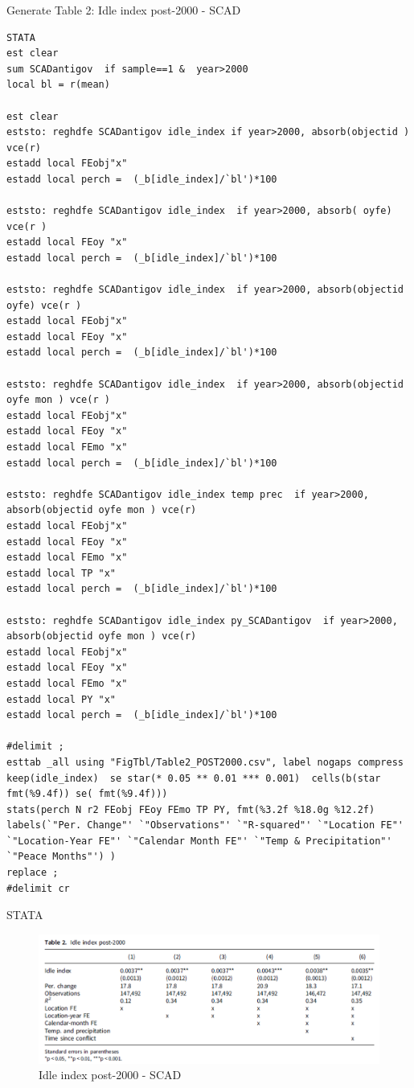 \documentclass[12pt,letterpaper]{article}
\begin{document}
\newpage

Generate Table 2: Idle index post-2000 - SCAD

\begin{lstlisting}
STATA
est clear 
sum SCADantigov  if sample==1 &  year>2000
local bl = r(mean) 

est clear
eststo: reghdfe SCADantigov idle_index if year>2000, absorb(objectid ) vce(r)  
estadd local FEobj"x"
estadd local perch =  (_b[idle_index]/`bl')*100

eststo: reghdfe SCADantigov idle_index  if year>2000, absorb( oyfe) vce(r )  
estadd local FEoy "x"
estadd local perch =  (_b[idle_index]/`bl')*100

eststo: reghdfe SCADantigov idle_index  if year>2000, absorb(objectid oyfe) vce(r )  
estadd local FEobj"x"
estadd local FEoy "x"
estadd local perch =  (_b[idle_index]/`bl')*100

eststo: reghdfe SCADantigov idle_index  if year>2000, absorb(objectid oyfe mon ) vce(r )  
estadd local FEobj"x"
estadd local FEoy "x"
estadd local FEmo "x"
estadd local perch =  (_b[idle_index]/`bl')*100

eststo: reghdfe SCADantigov idle_index temp prec  if year>2000, absorb(objectid oyfe mon ) vce(r)  
estadd local FEobj"x"
estadd local FEoy "x"
estadd local FEmo "x"
estadd local TP "x"
estadd local perch =  (_b[idle_index]/`bl')*100

eststo: reghdfe SCADantigov idle_index py_SCADantigov  if year>2000, absorb(objectid oyfe mon ) vce(r)  
estadd local FEobj"x"
estadd local FEoy "x"
estadd local FEmo "x"
estadd local PY "x"
estadd local perch =  (_b[idle_index]/`bl')*100

#delimit ; 
esttab _all using "FigTbl/Table2_POST2000.csv", label nogaps compress 
keep(idle_index)  se star(* 0.05 ** 0.01 *** 0.001)  cells(b(star fmt(%9.4f)) se( fmt(%9.4f)))
stats(perch N r2 FEobj FEoy FEmo TP PY, fmt(%3.2f %18.0g %12.2f) labels(`"Per. Change"' `"Observations"' `"R-squared"' `"Location FE"' `"Location-Year FE"' `"Calendar Month FE"' `"Temp & Precipitation"' `"Peace Months"') )
replace ; 
#delimit cr 
\end{lstlisting}

STATA
\begin{figure}[htbp]
	\centering
	\includegraphics[width=1.0\textwidth]{Table 2 Idle index post-2000 - SCAD.png}
	\caption{Idle index post-2000 - SCAD}
	\label{fig:agri_conflict}
\end{figure}
\end{document}
